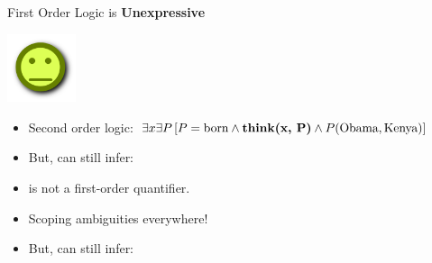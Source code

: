 \begin{frame}{First Order Logic is \textbf{Unexpressive}}
\begin{center}
  \includegraphics[height=2cm]{../img/pokerface.png}
\end{center}

\begin{itemize}
\item Second order logic: 
      $\exists x \exists P \left[ P = \textrm{born} \land \textbf{\textrm{think}(x, P)} \land P(\textrm{Obama}, \textrm{Kenya}) \right]$
\pause
\item But, can still infer: 
\end{itemize}
\vspace{1ex}
\pause


\begin{itemize}
\item {} is not a first-order quantifier.
\item Scoping ambiguities everywhere!
\pause
\item But, can still infer: 
\end{itemize}
\end{frame}


